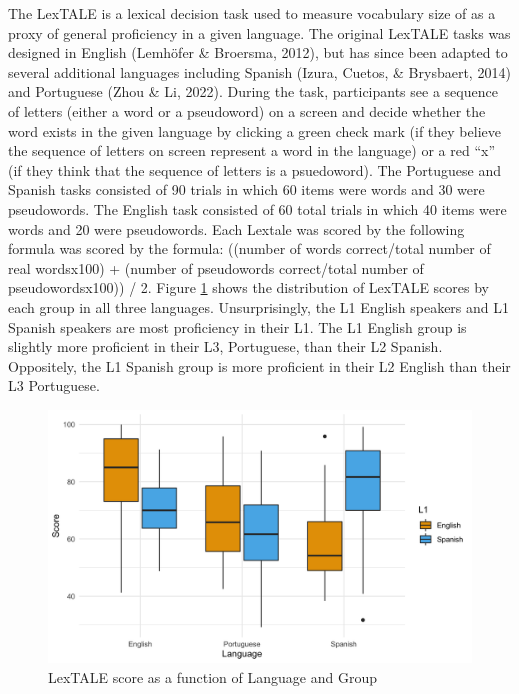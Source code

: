 \documentclass[
  man]{apa6}
\begin{document}
The LexTALE is a lexical decision task used to measure vocabulary size of as a proxy of general proficiency in a given language.
The original LexTALE tasks was designed in English (Lemhöfer \& Broersma, 2012), but has since been adapted to several additional languages including Spanish (Izura, Cuetos, \& Brysbaert, 2014) and Portuguese (Zhou \& Li, 2022).
During the task, participants see a sequence of letters (either a word or a pseudoword) on a screen and decide whether the word exists in the given language by clicking a green check mark (if they believe the sequence of letters on screen represent a word in the language) or a red ``x'' (if they think that the sequence of letters is a psuedoword).
The Portuguese and Spanish tasks consisted of 90 trials in which 60 items were words and 30 were pseudowords.
The English task consisted of 60 total trials in which 40 items were words and 20 were pseudowords.
Each Lextale was scored by the following formula was scored by the formula: ((number of words correct/total number of real wordsx100) + (number of pseudowords correct/total number of pseudowordsx100)) / 2.
Figure \ref{fig:prof-desc} shows the distribution of LexTALE scores by each group in all three languages.
Unsurprisingly, the L1 English speakers and L1 Spanish speakers are most proficiency in their L1.
The L1 English group is slightly more proficient in their L3, Portuguese, than their L2 Spanish.
Oppositely, the L1 Spanish group is more proficient in their L2 English than their L3 Portuguese.

\begin{figure}
\includegraphics[width=7.19in]{docs/figs/prof_plot} \caption{LexTALE score as a function of Language and Group}\label{fig:prof-desc}
\end{figure}
\end{document}
